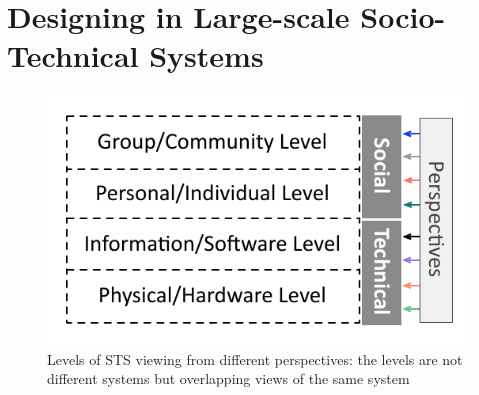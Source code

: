 \section{Designing in Large-scale Socio-Technical Systems}
\label{sec:design}



\begin{figure}[t]
\sidecaption[t]
\includegraphics[scale=.5]{img/sts_levels.pdf}
\caption{Levels of STS viewing from different perspectives: the levels are not different systems but overlapping views of the same system \cite{Whitworth2009,Whitworth2013}}
\label{fig:sts_levels} 
\end{figure}


